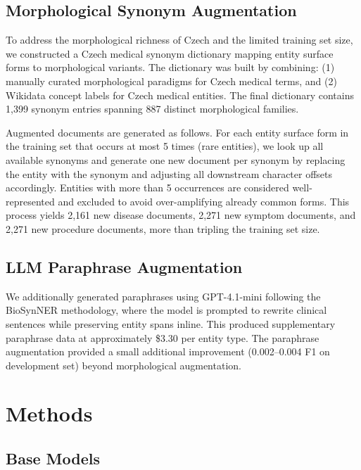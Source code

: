 \documentclass[11pt]{article}
\begin{document}
\subsection{Morphological Synonym Augmentation}

To address the morphological richness of Czech and the limited training set size, we
constructed a Czech medical synonym dictionary mapping entity surface forms to
morphological variants. The dictionary was built by combining:
(1) manually curated morphological paradigms for Czech medical terms,
and (2) Wikidata concept labels for Czech medical entities.
The final dictionary contains 1,399 synonym entries spanning 887 distinct morphological
families.

Augmented documents are generated as follows. For each entity surface form in the training
set that occurs at most 5 times (rare entities), we look up all available synonyms and
generate one new document per synonym by replacing the entity with the synonym and
adjusting all downstream character offsets accordingly. Entities with
more than 5 occurrences are considered well-represented and excluded to avoid over-amplifying
already common forms. This process yields 2,161 new disease documents, 2,271 new symptom
documents, and 2,271 new procedure documents, more than tripling the training set size.

\subsection{LLM Paraphrase Augmentation}

We additionally generated paraphrases using GPT-4.1-mini following the BioSynNER
methodology, where the model is prompted to rewrite clinical sentences while preserving
entity spans inline. This produced supplementary paraphrase data at approximately \$3.30
per entity type. The paraphrase augmentation provided a small additional improvement
(0.002--0.004 F1 on development set) beyond morphological augmentation.

\section{Methods}

\subsection{Base Models}
\end{document}
